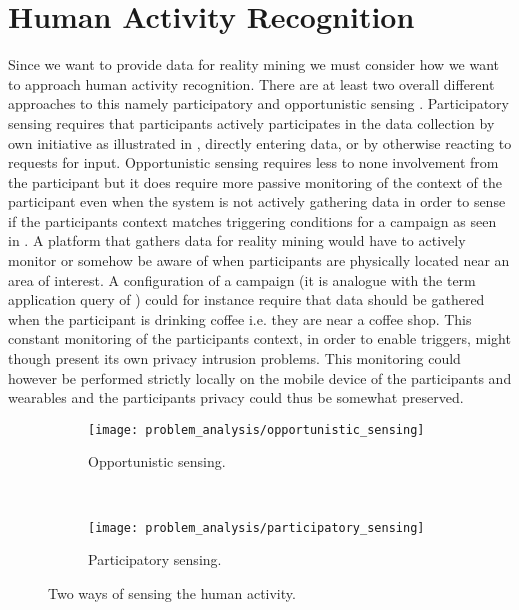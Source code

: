 
\section{Human Activity Recognition}
\label{sec:human_activity_recognition}

Since we want to provide data for reality mining we must consider how we want to approach human activity recognition. There are at least two overall different approaches to this namely participatory and opportunistic sensing \parencite{opp_or_par} \parencite{har_wearables}. Participatory sensing requires that participants actively participates in the data collection by own initiative as illustrated in , directly entering data, or by otherwise reacting to requests for input. Opportunistic sensing requires less to none involvement from the participant but it does require more passive monitoring of the context of the participant even when the system is not actively gathering data in order to sense if the participants context matches triggering conditions for a campaign as seen in . A platform that gathers data for reality mining would have to actively monitor or somehow be aware of when participants are physically located near an area of interest. A configuration of a campaign (it is analogue with the term application query of \parencite{opp_or_par}) could for instance require that data should be gathered when the participant is drinking coffee i.e. they are near a coffee shop. This constant monitoring of the participants context, in order to enable triggers, might though present its own privacy intrusion problems. This monitoring could however be performed strictly locally on the mobile device of the participants and wearables and the participants privacy could thus be somewhat preserved.

\begin{figure}[!htbp]
\begin{subfigure}[!t]{.45\textwidth}
  \centering
  \texttt{[image: problem\_analysis/opportunistic\_sensing]}
  \caption{Opportunistic sensing.}
  \label{fig:opportunistic_sensing}
\end{subfigure}
~
\begin{subfigure}[!t]{.45\textwidth}
  \centering
  \texttt{[image: problem\_analysis/participatory\_sensing]}
  \caption{Participatory sensing.}
  \label{fig:participatory_sensing}
\end{subfigure}
\caption{Two ways of sensing the human activity.}
\label{fig:sensing_types}
\end{figure}


